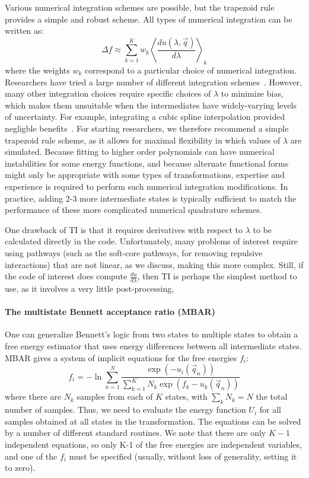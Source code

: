 \documentclass[9pt,bestpractices]{livecoms}
\newcommand{\expect}[1]{\left\langle{#1}\right\rangle}
\begin{document}
Various numerical integration schemes are possible, but the trapezoid
rule provides a simple and robust scheme.  All types of
numerical integration can be written as:
\[ \Delta f \approx \sum_{k=1}^{K} w_k
\expect{\frac{du(\lambda,\vec{q})}{d\lambda}}_{k} \] where the weights
$w_k$ correspond to a particular choice of numerical integration.
Researchers have tried a large number of different integration
schemes~\cite{resat1993studies,jorge2010effect,shyu2009reducing}. However, many other integration choices require specific choices of $\lambda$
to minimize bias, which makes them unsuitable when the intermediates
have widely-varying levels of uncertainty. For example, integrating a cubic spline interpolation provided negligble benefits~\cite{paliwal2011benchmark}. For starting researchers, we therefore recommend a simple trapezoid rule scheme, as it allows for maximal flexibility in which values of $\lambda$ are simulated.  Because fitting to higher
order polynomials can have numerical instabilities for some energy functions, and because alternate functional forms might only be appropriate
with some types of transformations, expertise and experience is
required to perform such numerical integration modifications.  In practice, adding 2-3 more intermediate states is typically sufficient to match the performance of these more complicated numerical quadrature schemes.

One drawback of TI is that it requires derivatives with respect to $\lambda$ to be calculated directly in the code. Unfortunately, many problems of interest
require using pathways (such as the soft-core pathways, for removing repulsive interactions) that are not linear, as we discuss, making this more complex.  Still, if the code of interest does compute $\frac{du}{d\lambda}$, then TI is perhaps the simplest method to use, as it involves a very little post-processing,

\paragraph{The multistate Bennett acceptance ratio (MBAR)}

One can generalize Bennett's logic from two states to multiple states to obtain a free energy estimator that uses energy differences between all intermediate states.  MBAR gives a system of implicit equations for the free energies $f_i$:
\begin{equation}
f_i = - \ln \sum_{n=1}^{N} \frac{\exp(-u_i(\vec{q}_n))}{\sum_{k=1}^K N_k \exp(f_k-u_k(\vec{q}_n))}
\end{equation}
where there are $N_k$ samples from each of $K$ states, with $\sum_k N_k=N$ the total number of samples. Thus, we need to evaluate the energy function $U_i$ for all samples obtained at all states in the transformation. The equations can be solved by a number of different standard routines.  We note that there are only $K-1$ independent equations, so only K-1 of the free energies are independent variables, and one of the $f_i$ must be specified (usually, without loss of generality, setting it to zero).
\end{document}
